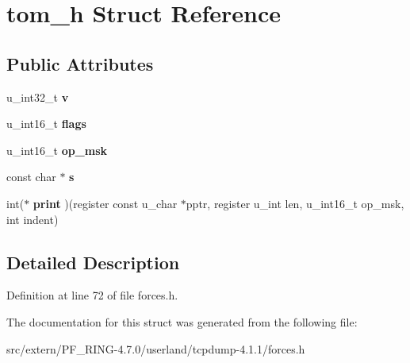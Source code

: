 \hypertarget{structtom__h}{
\section{tom\_\-h Struct Reference}
\label{structtom__h}
}
\subsection*{Public Attributes}
\begin{DoxyCompactItemize}
\item 
\hypertarget{structtom__h_a507b8576a89d5c9f045ac84388771646}{
u\_\-int32\_\-t {\bfseries v}}
\label{structtom__h_a507b8576a89d5c9f045ac84388771646}

\item 
\hypertarget{structtom__h_aa138f6d090209f0ef9a18830493478cb}{
u\_\-int16\_\-t {\bfseries flags}}
\label{structtom__h_aa138f6d090209f0ef9a18830493478cb}

\item 
\hypertarget{structtom__h_ae4b469fa96528f4588e17d2ff6e94351}{
u\_\-int16\_\-t {\bfseries op\_\-msk}}
\label{structtom__h_ae4b469fa96528f4588e17d2ff6e94351}

\item 
\hypertarget{structtom__h_aeb9840ead167446a3f0e0753656e58a0}{
const char $\ast$ {\bfseries s}}
\label{structtom__h_aeb9840ead167446a3f0e0753656e58a0}

\item 
\hypertarget{structtom__h_a6fab74afc5921cd8da4c5fc79a8c7695}{
int($\ast$ {\bfseries print} )(register const u\_\-char $\ast$pptr, register u\_\-int len, u\_\-int16\_\-t op\_\-msk, int indent)}
\label{structtom__h_a6fab74afc5921cd8da4c5fc79a8c7695}

\end{DoxyCompactItemize}


\subsection{Detailed Description}


Definition at line 72 of file forces.h.



The documentation for this struct was generated from the following file:\begin{DoxyCompactItemize}
\item 
src/extern/PF\_\-RING-\/4.7.0/userland/tcpdump-\/4.1.1/forces.h\end{DoxyCompactItemize}
